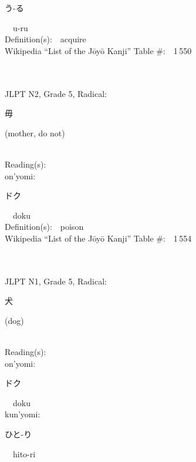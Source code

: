 \begin{multicols}{2}
{\hspace*{2em}}{\begin{CJK}{UTF8}{min} う-る \end{CJK}}\ \ u-ru\ \ \\
Definition(s):\ \ acquire \\
Wikipedia ``List of the J\=oy\=o Kanji'' Table \#:\ \ 1\,550 \\
\ \ \\
{\fontsize{34pt}{40pt}  }\ \ \\  %
{JLPT N2, Grade 5, Radical:\ \ {\begin{CJK}{UTF8}{min} 毋 \end{CJK}} (mother, do not) } \\
Reading(s):\ \ \\
{\hspace*{1em}}on'yomi:\ \ \\
{\hspace*{2em}}{\begin{CJK}{UTF8}{min} ドク \end{CJK}}\ \ doku\ \ \\
Definition(s):\ \ poison \\
Wikipedia ``List of the J\=oy\=o Kanji'' Table \#:\ \ 1\,554 \\
\ \ \\
{\fontsize{34pt}{40pt}  }\ \ \\  %
{JLPT N1, Grade 5, Radical:\ \ {\begin{CJK}{UTF8}{min} 犬 \end{CJK}} (dog) } \\
Reading(s):\ \ \\
{\hspace*{1em}}on'yomi:\ \ \\
{\hspace*{2em}}{\begin{CJK}{UTF8}{min} ドク \end{CJK}}\ \ doku\ \ \\
{\hspace*{1em}}kun'yomi:\ \ \\
{\hspace*{2em}}{\begin{CJK}{UTF8}{min} ひと-り \end{CJK}}\ \ hito-ri\ \ \\

\end{multicols}
